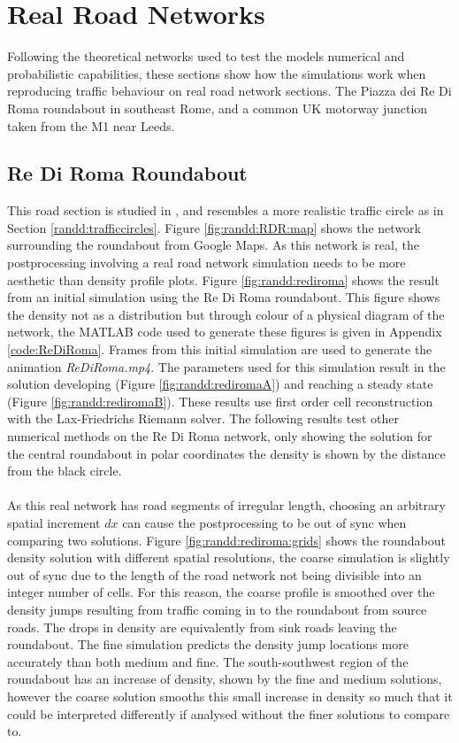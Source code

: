 \section{Real Road Networks}

	Following the theoretical networks used to test the models numerical and probabilistic capabilities, these sections show how the simulations work when reproducing traffic behaviour on real road network sections. The Piazza dei Re Di Roma roundabout in southeast Rome, and a common UK motorway junction taken from the M1 near Leeds.

\subsection{Re Di Roma Roundabout}

	This road section is studied in \cite{Bretti07}, and resembles a more realistic traffic circle as in Section \ref{randd:trafficcircles}. Figure \ref{fig:randd:RDR:map} shows the network surrounding the roundabout from Google Maps. As this network is real, the postprocessing involving a real road network simulation needs to be more aesthetic than density profile plots. Figure \ref{fig:randd:rediroma} shows the result from an initial simulation using the Re Di Roma roundabout. This figure shows the density not as a distribution but through colour of a physical diagram of the network, the MATLAB code used to generate these figures is given in Appendix \ref{code:ReDiRoma}. Frames from this initial simulation are used to generate the animation \emph{ReDiRoma.mp4}. The parameters used for this simulation result in the solution developing (Figure \ref{fig:randd:rediromaA}) and reaching a steady state (Figure \ref{fig:randd:rediromaB}). These results use first order cell reconstruction with the Lax-Friedrichs Riemann solver. The following results test other numerical methods on the Re Di Roma network, only showing the solution for the central roundabout in polar coordinates the density is shown by the distance from the black circle.
	\\ \\
	As this real network has road segments of irregular length, choosing an arbitrary spatial increment $dx$ can cause the postprocessing to be out of sync when comparing two solutions. Figure \ref{fig:randd:rediroma:grids} shows the roundabout density solution with different spatial resolutions, the coarse simulation is slightly out of sync due to the length of the road network not being divisible into an integer number of cells. For this reason, the coarse profile is smoothed over the density jumps resulting from traffic coming in to the roundabout from source roads. The drops in density are equivalently from sink roads leaving the roundabout. The fine simulation predicts the density jump locations more accurately than both medium and fine. The south-southwest region of the roundabout has an increase of density, shown by the fine and medium solutions, however the coarse solution smooths this small increase in density so much that it could be interpreted differently if analysed without the finer solutions to compare to.
